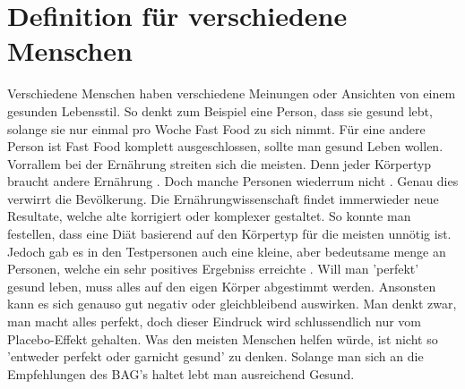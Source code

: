 \section{Definition für verschiedene Menschen}
\authortoc{\jonas}{\sectionident}
Verschiedene Menschen haben verschiedene Meinungen oder Ansichten von einem gesunden Lebensstil. So denkt zum Beispiel eine Person, dass sie gesund lebt, solange sie nur einmal pro Woche Fast Food zu sich nimmt. Für eine andere Person ist Fast Food komplett ausgeschlossen, sollte man gesund Leben wollen. Vorrallem bei der Ernährung streiten sich die meisten. Denn jeder Körpertyp braucht andere Ernährung \cite{all-about-body-type-eating}. Doch manche Personen wiederrum nicht \cite{all-about-body-type-eating}. Genau dies verwirrt die Bevölkerung.
\newline
Die Ernährungwissenschaft findet immerwieder neue Resultate, welche alte korrigiert oder komplexer gestaltet. So konnte man festellen, dass eine Diät basierend auf den Körpertyp für die meisten unnötig ist. Jedoch gab es in den Testpersonen auch eine kleine, aber bedeutsame menge an Personen, welche ein sehr positives Ergebniss erreichte \cite{all-about-body-type-eating}.
\newline
\newline
Will man 'perfekt' gesund leben, muss alles auf den eigen Körper abgestimmt werden. Ansonsten kann es sich genauso gut negativ oder gleichbleibend auswirken. Man denkt zwar, man macht alles perfekt, doch dieser Eindruck wird schlussendlich nur vom Placebo-Effekt gehalten.
\newline
\newline
Was den meisten Menschen helfen würde, ist nicht so 'entweder perfekt oder garnicht gesund' zu denken. Solange man sich an die Empfehlungen des BAG's haltet lebt man ausreichend Gesund.
